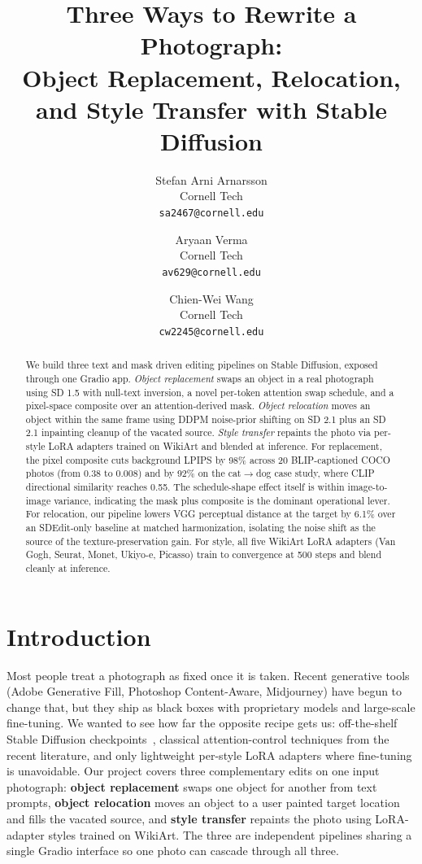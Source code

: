 \documentclass[10pt,twocolumn,letterpaper]{article}
\title{Three Ways to Rewrite a Photograph: \\ Object Replacement, Relocation, and Style Transfer with Stable Diffusion}
\author{Stefan Arni Arnarsson \\
Cornell Tech \\
{\tt\small sa2467@cornell.edu}
\and
Aryaan Verma \\
Cornell Tech \\
{\tt\small av629@cornell.edu}
\and
Chien-Wei Wang \\
Cornell Tech \\
{\tt\small cw2245@cornell.edu}
}
\begin{document}
\maketitle

\begin{abstract}
We build three text and mask driven editing pipelines on Stable Diffusion, exposed through one Gradio app. \emph{Object replacement} swaps an object in a real photograph using SD 1.5 with null-text inversion, a novel per-token attention swap schedule, and a pixel-space composite over an attention-derived mask. \emph{Object relocation} moves an object within the same frame using DDPM noise-prior shifting on SD 2.1 plus an SD 2.1 inpainting cleanup of the vacated source. \emph{Style transfer} repaints the photo via per-style LoRA adapters trained on WikiArt and blended at inference. For replacement, the pixel composite cuts background LPIPS by 98\% across 20 BLIP-captioned COCO photos (from $0.38$ to $0.008$) and by 92\% on the cat$\to$dog case study, where CLIP directional similarity reaches 0.55. The schedule-shape effect itself is within image-to-image variance, indicating the mask plus composite is the dominant operational lever. For relocation, our pipeline lowers VGG perceptual distance at the target by 6.1\% over an SDEdit-only baseline at matched harmonization, isolating the noise shift as the source of the texture-preservation gain. For style, all five WikiArt LoRA adapters (Van Gogh, Seurat, Monet, Ukiyo-e, Picasso) train to convergence at 500 steps and blend cleanly at inference.
\end{abstract}

\section{Introduction}
\label{sec:intro}

Most people treat a photograph as fixed once it is taken. Recent generative tools (Adobe Generative Fill, Photoshop Content-Aware, Midjourney) have begun to change that, but they ship as black boxes with proprietary models and large-scale fine-tuning. We wanted to see how far the opposite recipe gets us: off-the-shelf Stable Diffusion checkpoints~\cite{rombach2022sd}, classical attention-control techniques from the recent literature, and only lightweight per-style LoRA adapters where fine-tuning is unavoidable. Our project covers three complementary edits on one input photograph: \textbf{object replacement} swaps one object for another from text prompts, \textbf{object relocation} moves an object to a user painted target location and fills the vacated source, and \textbf{style transfer} repaints the photo using LoRA-adapter styles trained on WikiArt. The three are independent pipelines sharing a single Gradio interface so one photo can cascade through all three.
\end{document}

